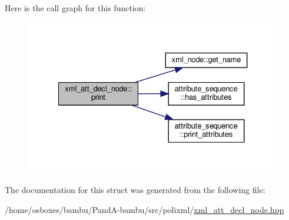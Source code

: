Here is the call graph for this function\+:
\nopagebreak
\begin{figure}[H]
\begin{center}
\leavevmode
\includegraphics[width=327pt]{d2/dfa/structxml__att__decl__node_a600970122689d8a18739cf36b1b8698d_cgraph}
\end{center}
\end{figure}


The documentation for this struct was generated from the following file\+:\begin{DoxyCompactItemize}
\item 
/home/osboxes/bambu/\+Pand\+A-\/bambu/src/polixml/\hyperlink{xml__att__decl__node_8hpp}{xml\+\_\+att\+\_\+decl\+\_\+node.\+hpp}\end{DoxyCompactItemize}
